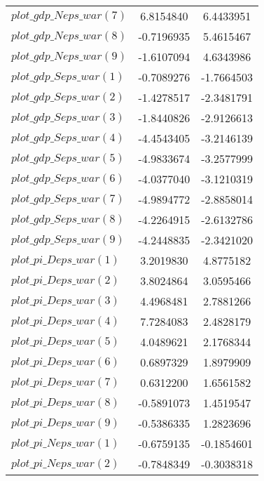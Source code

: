 \begin{center}
\begin{longtable}{lcc}
$plot\_gdp\_N eps\_war (7)  $	 & 	      6.8154840	 & 	      6.4433951 \\ 
$plot\_gdp\_N eps\_war (8)  $	 & 	     -0.7196935	 & 	      5.4615467 \\ 
$plot\_gdp\_N eps\_war (9)  $	 & 	     -1.6107094	 & 	      4.6343986 \\ 
$plot\_gdp\_S eps\_war (1)  $	 & 	     -0.7089276	 & 	     -1.7664503 \\ 
$plot\_gdp\_S eps\_war (2)  $	 & 	     -1.4278517	 & 	     -2.3481791 \\ 
$plot\_gdp\_S eps\_war (3)  $	 & 	     -1.8440826	 & 	     -2.9126613 \\ 
$plot\_gdp\_S eps\_war (4)  $	 & 	     -4.4543405	 & 	     -3.2146139 \\ 
$plot\_gdp\_S eps\_war (5)  $	 & 	     -4.9833674	 & 	     -3.2577999 \\ 
$plot\_gdp\_S eps\_war (6)  $	 & 	     -4.0377040	 & 	     -3.1210319 \\ 
$plot\_gdp\_S eps\_war (7)  $	 & 	     -4.9894772	 & 	     -2.8858014 \\ 
$plot\_gdp\_S eps\_war (8)  $	 & 	     -4.2264915	 & 	     -2.6132786 \\ 
$plot\_gdp\_S eps\_war (9)  $	 & 	     -4.2448835	 & 	     -2.3421020 \\ 
$plot\_pi\_D eps\_war (1)   $	 & 	      3.2019830	 & 	      4.8775182 \\ 
$plot\_pi\_D eps\_war (2)   $	 & 	      3.8024864	 & 	      3.0595466 \\ 
$plot\_pi\_D eps\_war (3)   $	 & 	      4.4968481	 & 	      2.7881266 \\ 
$plot\_pi\_D eps\_war (4)   $	 & 	      7.7284083	 & 	      2.4828179 \\ 
$plot\_pi\_D eps\_war (5)   $	 & 	      4.0489621	 & 	      2.1768344 \\ 
$plot\_pi\_D eps\_war (6)   $	 & 	      0.6897329	 & 	      1.8979909 \\ 
$plot\_pi\_D eps\_war (7)   $	 & 	      0.6312200	 & 	      1.6561582 \\ 
$plot\_pi\_D eps\_war (8)   $	 & 	     -0.5891073	 & 	      1.4519547 \\ 
$plot\_pi\_D eps\_war (9)   $	 & 	     -0.5386335	 & 	      1.2823696 \\ 
$plot\_pi\_N eps\_war (1)   $	 & 	     -0.6759135	 & 	     -0.1854601 \\ 
$plot\_pi\_N eps\_war (2)   $	 & 	     -0.7848349	 & 	     -0.3038318 \\ 

\end{longtable}
\end{center}
